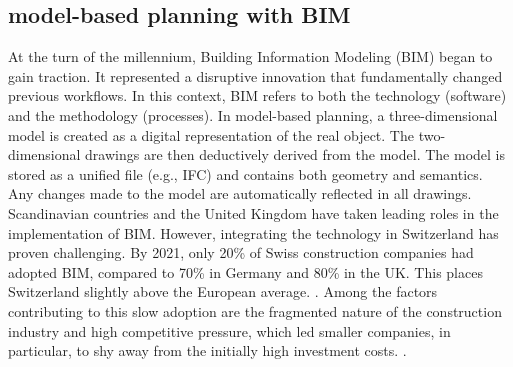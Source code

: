 \begin{comment}
Ab der Jahrtausendwende begann sich Building Information Modelling (BIM) zu verbreiten. Es handelte sich um eine disruptive innovation, bei der die bisherigen arbeitsschritte grundlegend verändert wurden. in diesem zusammenhng wird BIM sowohl für die technik (software) als auch für die arbeitsweise (prozesse) verwendet. bei der modellbasierten planung wird ein dreidimensionales modell als digitales abbild des realen objekts erstellt. die zweidimensionalen zeichnungen werden anschliessend deduktiv aus dem modell abgeleitet. das modell wird als einheitliche datei (z.b. ifc) gespeichert und enthält sowohl geometrie als auch semantik. änderungen am modell werden automatisch in allen zeichnungen übernommen. \\
Vorreiterrollen bei der Implementierung von BIM haben die skandinavischen Länder sowie grossbritanien. die implementierung der technologie gestaltete sich in der schweiz schwierig. Im Jahr 2021 wurde gerademal bei 20\% der Schweizer Bauunternehmen BIM eingesetzt (DE: 70\%, UK: 80\%). Die schweiz befindet sich damit im europäischen vergleich knapp im durchschnitt. \cite{heinrichSchweizImBIMEuropavergleich2022}. Unter anderem führte die fragmentierte Bauwirtschaft und der hohhe wettbewerbsdruck dazu, dass besonders kleinere Unternehmen die anfänglich hohen investitionskosten scheuten. \cite{ivanicErfolgreicheEinfuehrungBuilding2020}. \\
\end{comment}
\subsection{model-based planning with BIM}
At the turn of the millennium, Building Information Modeling (BIM) began to gain traction. It represented a disruptive innovation that fundamentally changed previous workflows. In this context, BIM refers to both the technology (software) and the methodology (processes). In model-based planning, a three-dimensional model is created as a digital representation of the real object. The two-dimensional drawings are then deductively derived from the model. The model is stored as a unified file (e.g., IFC) and contains both geometry and semantics. Any changes made to the model are automatically reflected in all drawings. \\
Scandinavian countries and the United Kingdom have taken leading roles in the implementation of BIM. However, integrating the technology in Switzerland has proven challenging. By 2021, only 20\% of Swiss construction companies had adopted BIM, compared to 70\% in Germany and 80\% in the UK. This places Switzerland slightly above the European average. \cite{heinrichSchweizImBIMEuropavergleich2022}. Among the factors contributing to this slow adoption are the fragmented nature of the construction industry and high competitive pressure, which led smaller companies, in particular, to shy away from the initially high investment costs. \cite{ivanicErfolgreicheEinfuehrungBuilding2020}. \

